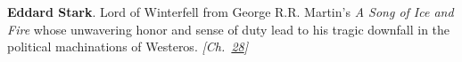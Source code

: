 \textbf{Eddard Stark}. Lord of Winterfell from George R.R. Martin's \emph{A Song of Ice and Fire} whose unwavering honor and sense of duty lead to his tragic downfall in the political machinations of Westeros. \emph{[Ch.~\hyperref[ch:negativetemperature]{28}]}

